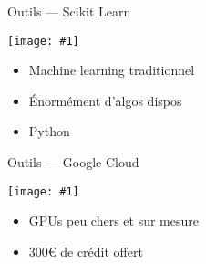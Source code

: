 \documentclass{beamer}
\newcommand\cimgsm[1]{\vfill\centerline{\texttt{[image: \#1]}}\vfill}
\begin{document}
\begin{frame}{Outils --- Scikit Learn}
  \cimgsm{scikit.png}
  \begin{itemize}
  \item Machine learning \og traditionnel\fg{}
  \item Énormément d'algos dispos
  \item Python
  \end{itemize}
\end{frame}
\begin{frame}{Outils --- Google Cloud}
  \cimgsm{google-cloud.png}
  \begin{itemize}
  \item GPUs peu chers et sur mesure
  \item 300€ de crédit offert
  \end{itemize}
\end{frame}
\end{document}
